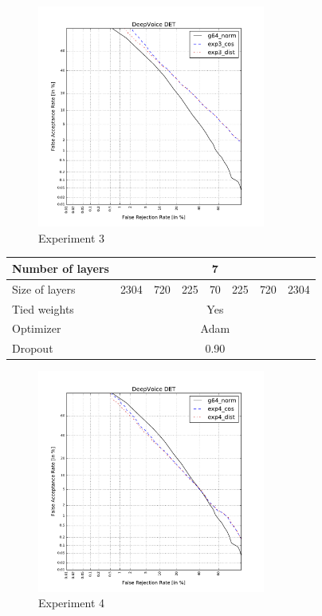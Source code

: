 \documentclass[conference]{IEEEtran}
\begin{document}
\begin{figure}[!h]
    \centering
    \includegraphics[width=7.5cm]{../scores/det3.pdf}
    \captionsetup{labelformat=empty}
    \caption{Experiment 3}
\end{figure}


\newpage

\begin{table}[!h]
\centering
\begin{tabular}{|l|c|c|c|c|c|c|c|}
\hline
Number of layers & \multicolumn{7}{c|}{7}                \\ \hline
Size of layers   & 2304 & 720 & 225 & 70 & 225 & 720 & 2304  \\ \hline
Tied weights     & \multicolumn{7}{c|}{Yes}               \\ \hline
Optimizer        & \multicolumn{7}{c|}{Adam} \\ \hline
Dropout          & \multicolumn{7}{c|}{0.90} \\ \hline
\end{tabular}
\end{table}


\begin{figure}[!h]
    \centering
    \includegraphics[width=7.5cm]{../scores/det4.pdf}
    \captionsetup{labelformat=empty}
    \caption{Experiment 4}
\end{figure}
\end{document}
